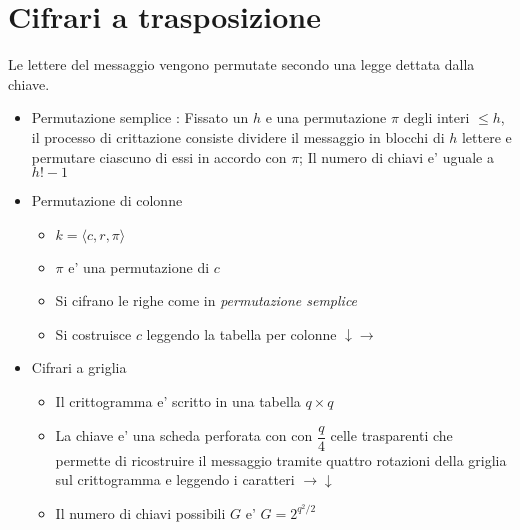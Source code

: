 \section{Cifrari a trasposizione}

Le lettere del messaggio vengono permutate secondo una legge dettata dalla chiave.

\begin{itemize}
    \item Permutazione semplice : Fissato un $h$ e una permutazione $\pi$ degli interi $\leq h$, il processo di crittazione consiste dividere il messaggio in blocchi di $h$ lettere e permutare ciascuno di essi in accordo con $\pi$; Il numero di chiavi e' uguale a $h! - 1$
    \item Permutazione di colonne
    \begin{itemize}
        \item $k = \langle c, r, \pi \rangle$
        \item $\pi$ e' una permutazione di $c$
        \item Si cifrano le righe come in \textit{permutazione semplice}
        \item Si costruisce $c$ leggendo la tabella per colonne $\downarrow \rightarrow$
    \end{itemize}
    \item Cifrari a griglia
    \begin{itemize}
        \item Il crittogramma e' scritto in una tabella $q \times q$
        \item La chiave e' una scheda perforata con con $\dfrac{q}{4}$ celle trasparenti che permette di ricostruire il messaggio tramite quattro rotazioni della griglia sul crittogramma e leggendo i caratteri $\rightarrow \downarrow$
        \item Il numero di chiavi possibili $G$ e' $G = 2^{q^2/2}$
    \end{itemize}
\end{itemize}